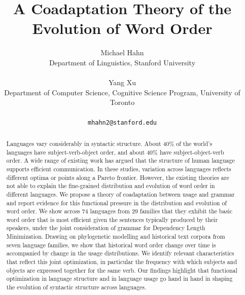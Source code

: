 \documentclass[11pt,a4paper]{article}
\title{A Coadaptation Theory of the Evolution of Word Order}
\author{Michael Hahn\\Department of Linguistics, Stanford University\\\\Yang Xu\\ Department of Computer Science, Cognitive Science Program, University of Toronto\\\\ \texttt{mhahn2@stanford.edu}}
\date{}
\begin{document}
\maketitle


\begin{abstract}
Languages vary considerably in syntactic structure.
About 40\% of the world's languages have subject-verb-object order, and about 40\% have subject-object-verb order.
A wide range of existing work has argued that the structure of human language supports efficient communication. In these studies, variation across languages reflects different optima or points along a Pareto frontier. However, the existing theories are not able to explain the fine-grained distribution and evolution of word order in different languages.
%
We propose a theory of coadaptation between usage and grammar and report evidence for this functional pressure in the distribution and evolution of word order. We show across 74 languages from 29 families that they exhibit the basic word order that is most efficient given the sentences typically produced by their speakers, under the joint consideration of grammar for Dependency Length Minimization.
Drawing on phylogenetic modelling and historical text corpora from seven language families, we show that historical word order change over time is accompanied by change in the usage distributions.
We identify relevant characteristics that reflect this joint optimization, in particular the frequency with which subjects and objects are expressed together for the same verb.
Our findings highlight that functional optimization in language structure and in language usage go hand in hand in shaping the evolution of syntactic structure across languages.
\end{abstract}

\end{document}
